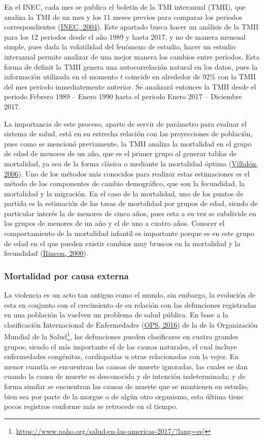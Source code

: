 \documentclass[
]{article}
\begin{document}
En el INEC, cada mes se publica el boletín de la TMI interanual (TMII),
que analiza la TMI de un mes y los 11 meses previos para comparar los
periodos correspondientes (\protect\hyperlink{ref-infantiles}{INEC,
2004}). Este apartado busca hacer un análisis de la TMII para los 12
periodos desde el año 1989 y hasta 2017, y no de manera mensual simple,
pues dada la volatilidad del fenómeno de estudio, hacer un estudio
interanual permite analizar de una mejor manera los cambios entre
periodos. Esta forma de definit la TMII genera una autocorrelación
natural en los datos, pues la información utilizada en el momento \(t\)
coincide en alrededor de 92\% con la TMII del mes periodo inmediatemente
anterior. Se analizará entonces la TMII desde el periodo Febrero 1989 --
Enero 1990 hasta el periodo Enero 2017 -- Diciembre 2017.

La importancia de este proceso, aparte de servir de parámetro para
evaluar el sistema de salud, está en su estrecha relación con las
proyecciones de población, pues como se mencionó previamente, la TMII
analiza la mortalidad en el grupo de edad de menores de un año, que es
el primer grupo al generar tablas de mortalidad, ya sea de la forma
clásica o mediante la mortalidad óptima
(\protect\hyperlink{ref-mortalidad_optima}{Villalón, 2006}). Uno de los
métodos más conocidos para realizar estas estimaciones es el método de
los componentes de cambio demográfico, que son la fecundidad, la
mortalidad y la migración. En el caso de la mortalidad, uno de los
puntos de partida es la estimación de las tasas de mortalidad por grupos
de edad, siendo de particular interés la de menores de cinco años, pues
esta a su vez se subdivide en los grupos de menores de un año y el de
uno a cuatro años. Conocer el comportamiento de la mortalidad infantil
es importante porque es en este grupo de edad en el que pueden existir
cambios muy bruscos en la mortalidad y la fecundidad
(\protect\hyperlink{ref-Rincon}{Rincon, 2000}).

\subsubsection{Mortalidad por causa externa}

La violencia es un acto tan antiguo como el mundo, sin embargo, la
evolución de esta en conjunto con el crecimiento de su relación con las
defunciones registradas en una población la vuelven un problema de salud
pública. En base a la clasificación Internacional de Enfermedades
(\protect\hyperlink{ref-CIE10}{OPS, 2016}) de la de la Organización
Mundial de la Salud\footnote{\url{https://www.paho.org/salud-en-las-americas-2017/?lang=es}{]}},
las defunciones pueden clasificarse en cuatro grandes grupos, siendo el
más importante el de las causas naturales, el cual incluye enfermedades
congénitas, cardiopatías u otras relacionadas con la vejez. En menor
cuantía se encuentran las causas de muerte ignoradas, las cuales se dan
cuando la causa de muerte es desconocida y de intención indeterminada; y
de forma similar se encuentran las causas de muerte que se mantienen en
estudio, bien sea por parte de la morgue o de algún otro organismo, esta
última tiene pocos registros conforme más se retrocede en el tiempo.
\end{document}
